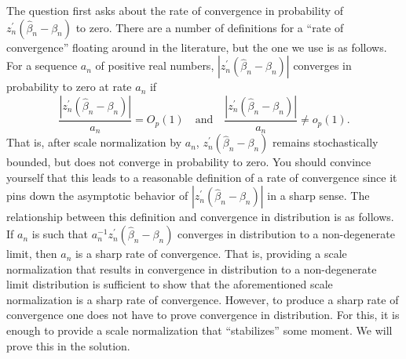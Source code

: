 \begin{remark}
The question first asks about the rate of convergence in probability of
\(z_{n}^{\prime} \left( \widehat{\beta}_{n} - \beta_{n} \right)\) to zero. There
are a number of definitions for a ``rate of convergence'' floating around in the
literature, but the one we use is as follows. For a sequence \(a_{n}\) of
positive real numbers, \(\left| z_{n}^{\prime} \left( \widehat{\beta}_{n} -
\beta_{n} \right) \right|\) converges in probability to zero at rate \(a_{n}\)
if
\[
  \frac{\left| z_{n}^{\prime} \left( \widehat{\beta}_{n} - \beta_{n} \right)
  \right|}{a_{n}} = O_{p} (1) \quad \text{and} \quad \frac{\left| z_{n}^{\prime}
  \left( \widehat{\beta}_{n} - \beta_{n} \right) \right|}{a_{n}} \neq o_{p} (1).
\]
That is, after scale normalization by \(a_{n}\), \(z_{n}^{\prime} \left(
\widehat{\beta}_{n} - \beta_{n} \right)\) remains stochastically bounded, but
does not converge in probability to zero. You should convince yourself that this
leads to a reasonable definition of a rate of convergence since it pins down the
asymptotic behavior of \(\left| z_{n}^{\prime} \left( \widehat{\beta}_{n} -
\beta_{n} \right) \right|\) in a sharp sense. The relationship between this
definition and convergence in distribution is as follows. If \(a_{n}\) is such
that \(a_{n}^{- 1} z_{n}^{\prime} \left( \widehat{\beta}_{n} - \beta_{n}
\right)\) converges in distribution to a non-degenerate limit, then \(a_{n}\) is
a sharp rate of convergence. That is, providing a scale normalization that
results in convergence in distribution to a non-degenerate limit distribution is
sufficient to show that the aforementioned scale normalization is a sharp rate
of convergence. However, to produce a sharp rate of convergence one does not
have to prove convergence in distribution. For this, it is enough to provide a
scale normalization that ``stabilizes'' some moment. We will prove this in the
solution.
\end{remark}

